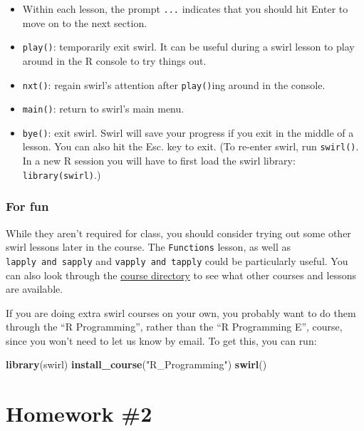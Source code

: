 \documentclass[]{book}
\makeatletter
\newenvironment{Shaded}{\begin{snugshade}}{\end{snugshade}}
\newcommand{\KeywordTok}[1]{\textcolor[rgb]{0.13,0.29,0.53}{\textbf{#1}}}
\newcommand{\StringTok}[1]{\textcolor[rgb]{0.31,0.60,0.02}{#1}}
\newcommand{\NormalTok}[1]{#1}
\providecommand{\tightlist}{%
  \setlength{\itemsep}{0pt}\setlength{\parskip}{0pt}}
\newenvironment{kframe}{%
\medskip{}
\setlength{\fboxsep}{.8em}
 \def\at@end@of@kframe{}%
 \ifinner\ifhmode%
  \def\at@end@of@kframe{\end{minipage}}%
  \begin{minipage}{\columnwidth}%
 \fi\fi%
 \def\FrameCommand##1{\hskip\@totalleftmargin \hskip-\fboxsep
 \colorbox{shadecolor}{##1}\hskip-\fboxsep
     \hskip-\linewidth \hskip-\@totalleftmargin \hskip\columnwidth}%
 \MakeFramed {\advance\hsize-\width
   \@totalleftmargin\z@ \linewidth\hsize
   \@setminipage}}%
 {\par\unskip\endMakeFramed%
 \at@end@of@kframe}
\renewenvironment{Shaded}{\begin{kframe}}{\end{kframe}}
\theoremstyle{definition}
\theoremstyle{definition}
\theoremstyle{definition}
\theoremstyle{remark}
\makeatother
\begin{document}
\begin{itemize}
\tightlist
\item
  Within each lesson, the prompt \texttt{...} indicates that you should
  hit Enter to move on to the next section.
\item
  \texttt{play()}: temporarily exit swirl. It can be useful during a
  swirl lesson to play around in the R console to try things out.
\item
  \texttt{nxt()}: regain swirl's attention after \texttt{play()}ing
  around in the console.
\item
  \texttt{main()}: return to swirl's main menu.
\item
  \texttt{bye()}: exit swirl. Swirl will save your progress if you exit
  in the middle of a lesson. You can also hit the Esc. key to exit. (To
  re-enter swirl, run \texttt{swirl()}. In a new R session you will have
  to first load the swirl library: \texttt{library(swirl)}.)
\end{itemize}

\subsubsection{For fun}\label{for-fun}

While they aren't required for class, you should consider trying out
some other swirl lessons later in the course. The \texttt{Functions}
lesson, as well as \texttt{lapply\ and\ sapply} and
\texttt{vapply\ and\ tapply} could be particularly useful. You can also
look through the \href{https://github.com/swirldev/swirl_courses}{course
directory} to see what other courses and lessons are available.

If you are doing extra swirl courses on your own, you probably want to
do them through the ``R Programming'', rather than the ``R Programming
E'', course, since you won't need to let us know by email. To get this,
you can run:

\begin{Shaded}
\begin{Highlighting}[]
\KeywordTok{library}\NormalTok{(swirl)}
\KeywordTok{install_course}\NormalTok{(}\StringTok{"R_Programming"}\NormalTok{)}
\KeywordTok{swirl}\NormalTok{()}
\end{Highlighting}
\end{Shaded}

\section{Homework \#2}\label{homework-2}
\end{document}
